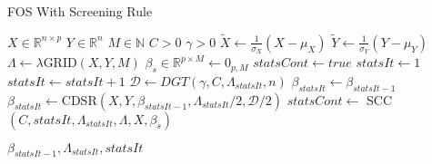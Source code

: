 \documentclass[letterpaper,11pt]{article}
\begin{document}
\FloatBarrier
\begin{algorithm}[!htbp]
  \caption{FOS With Screening Rule}
  \begin{algorithmic}[1]
  \Statex
  \Input{}
  \Statex $X \in \mathbb{R}^{n \times p} $ 
  \Statex $Y \in \mathbb{R}^n$  
  \Statex $M \in \mathbb{N}$  
  \Statex $C > 0$
  \Statex $\gamma > 0$
    \State $\widetilde{X} \gets \frac{1}{\sigma_X}\left( X - \mu_X \right)$ 
    \State $\widetilde{Y} \gets \frac{1}{\sigma_Y} \left( Y - \mu_Y \right)$ 
    \State $\Lambda \gets \lambda$GRID$( X, Y, M )$ 
    \State $\beta_s \in \mathbb{R}^{ p \times M } \gets 0_{p,M}$ 
    \State $statsCont \gets true$
    \State $statsIt \gets 1$
        \State $statsIt \gets statsIt + 1$
        \State $\mathcal{D} \gets DGT( \gamma, C, \Lambda_{statsIt}, n )$ 
            \State $\beta_{statsIt} \gets \beta_{statsIt-1}$
          \Else
            \State $\beta_{statsIt} \gets \text{CDSR}( X, Y, \beta_{statsIt-1}, \Lambda_{statsIt}/2, \mathcal{D}/2 )$
          \EndIf
          \State $statsCont \gets$ SCC $( C, statsIt, \Lambda_{statsIt}, \Lambda, X, \beta_s )$
      \EndWhile
  \end{algorithmic}
  \Return $\beta_{statsIt-1}, \Lambda_{statsIt}, statsIt$
\end{algorithm}
\FloatBarrier
\end{document}
